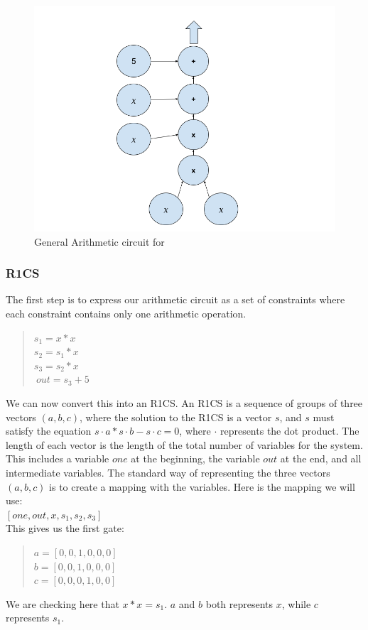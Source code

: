 \begin{figure}[H]
\centering
\includegraphics[width=130mm]{ArithmeticCircuit.png}
\caption{General Arithmetic circuit for }
\label{overflow}
\end{figure}

\subsubsection{R1CS}
\label{subsec:r1cs}
The first step is to express our arithmetic circuit as a set of constraints where each constraint contains only one arithmetic operation.
\begin{quote}
$s_1 = x * x$
\\
$s_2 = s_1 * x$
\\
$s_3 = s_2 * x$
\\
$~out = s_3 + 5$
\end{quote}

We can now convert this into an R1CS.
An R1CS is a sequence of groups of three vectors $(a, b, c)$, where the solution to the R1CS is a vector $s$, and $s$ must satisfy the equation $s \cdot a * s \cdot b - s \cdot c = 0$, where $\cdot$ represents the dot product.
The length of each vector is the length of the total number of variables for the system. This includes a variable $one$ at the beginning, the variable $out$ at the end, and all intermediate variables.
The standard way of representing the three vectors $(a, b, c)$ is to create a mapping with the variables.
Here is the mapping we will use:
\\ 
$[one,out,x,s_1,s_2,s_3]$
\\
This gives us the first gate:
\begin{quote}
   $a = [0,0,1,0,0,0]$
   \\
   $b = [0,0,1,0,0,0]$
   \\
   $c = [0,0,0,1,0,0]$
\end{quote}
We are checking here that $x*x=s_1$.
$a$ and $b$ both represents $x$, while $c$ represents $s_1$.

